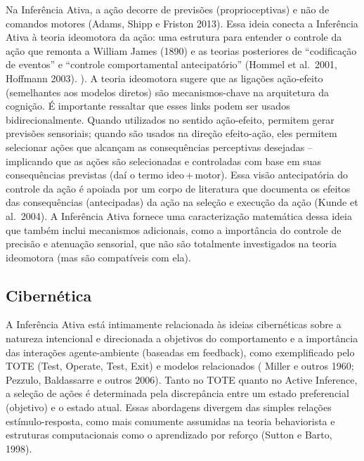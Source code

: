 \documentclass[
  12pt,
]{book}
\begin{document}
Na Inferência Ativa, a ação decorre de previsões (proprioceptivas) e não de comandos motores (Adams, Shipp e Friston 2013). Essa ideia conecta a Inferência Ativa à teoria ideomotora da ação: uma estrutura para entender o controle da ação que remonta a William James (1890) e as teorias posteriores de ``codificação de eventos'' e ``controle comportamental antecipatório'' (Hommel et al.~2001, Hoffmann 2003). ). A teoria ideomotora sugere que as ligações ação-efeito (semelhantes aos modelos diretos) são mecanismos-chave na arquitetura da cognição. É importante ressaltar que esses links podem ser usados \hspace{0pt}\hspace{0pt}bidirecionalmente. Quando utilizados no sentido ação-efeito, permitem gerar previsões sensoriais; quando são usados \hspace{0pt}\hspace{0pt}na direção efeito-ação, eles permitem selecionar ações que alcançam as consequências perceptivas desejadas -- implicando que as ações são selecionadas e controladas com base em suas consequências previstas (daí o termo ideo + motor). Essa visão antecipatória do controle da ação é apoiada por um corpo de literatura que documenta os efeitos das consequências (antecipadas) da ação na seleção e execução da ação (Kunde et al.~2004). A Inferência Ativa fornece uma caracterização matemática dessa ideia que também inclui mecanismos adicionais, como a importância do controle de precisão e atenuação sensorial, que não são totalmente investigados na teoria ideomotora (mas são compatíveis com ela).

\hypertarget{cibernuxe9tica}{%
\subsection{Cibernética}\label{cibernuxe9tica}}

A Inferência Ativa está intimamente relacionada às ideias cibernéticas sobre a natureza intencional e direcionada a objetivos do comportamento e a importância das interações agente-ambiente (baseadas em feedback), como exemplificado pelo TOTE (Test, Operate, Test, Exit) e modelos relacionados ( Miller e outros 1960; Pezzulo, Baldassarre e outros 2006). Tanto no TOTE quanto no Active Inference, a seleção de ações é determinada pela discrepância entre um estado preferencial (objetivo) e o estado atual. Essas abordagens divergem das simples relações estímulo-resposta, como mais comumente assumidas na teoria behaviorista e estruturas computacionais como o aprendizado por reforço (Sutton e Barto, 1998).
\end{document}
